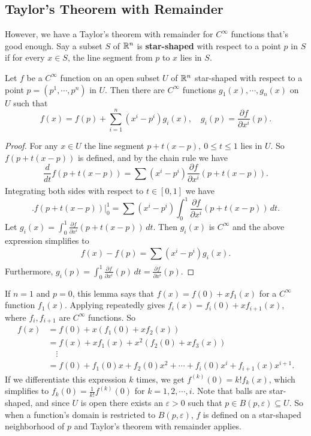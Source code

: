 \subsection{Taylor's Theorem with Remainder}
However, we have a Taylor's theorem with remainder for $C^{\infty}$ functions that's good enough. Say a subset $S$ of $\mathbb{R}^n $ is \textbf{star-shaped} with respect to a point $p$ in $S$ if for every $x\in S$, the line segment from $p$ to $x$ lies in $S$.
\begin{lemma}
    Let $f$ be a $C^{\infty}$ function on an open subset $U$ of $\mathbb{R}^n $ star-shaped with respect to a point $p=(p^1,\cdots ,p^n )$ in $U$. Then there are $C^{\infty}$ functions $g_1(x),\cdots ,g_n (x)$ on $U$ such that \[
        f(x)=f(p)+\sum_{i=1}^{n} (x^i -p^i )g_i (x), \quad g_i (p)=\frac{\partial f}{\partial x^i }(p).
    \]  
\end{lemma}
\begin{proof}
    For any $x\in U$ the line segment $p+t(x-p), \ 0\leq t \leq 1$ lies in $U$. So $f(p+t(x-p))$ is defined, and by the chain rule we have \[
        \frac{d}{dt}f(p+t(x-p))=\sum_{}^{} (x^i -p^i ) \frac{\partial f}{\partial x^i }(p+t(x-p)).
    \] Integrating both sides with respect to $t\in [0,1]$ we have \[
    \Big. f(p+t(x-p)) \Big| _0^1 = \sum_{}^{} (x^i -p^i )\int_{0}^{1} \frac{\partial f}{\partial x^i }(p+t(x-p)) \, dt.
\] Let $g_i (x)=\int_{0}^{1} \frac{\partial f}{\partial x^i }(p+t(x-p)) \, dt$. Then $g_i (x)$ is $C^{\infty}$ and the above expression simplifies to \[
f(x)-f(p)=\sum_{}^{} (x^i -p^i )g_i (x).
\] Furthermore, $g_i (p)=\int_{0}^{1} \frac{\partial f}{\partial x^i }(p) \, dt=\frac{\partial f}{\partial x^i }(p)$. 
\end{proof}
If $n=1$ and $p=0$, this lemma says that $f(x)=f(0)+xf_1(x)$ for a $C^{\infty}$ function $f_1(x)$. Applying repeatedly gives $f_i (x)=f_i (0)+xf_{i+1}(x)$, where $f_i ,f_{i+1}$ are $C^{\infty}$ functions. So 
\begin{align*}
    f(x)&=f(0)+x(f_1(0)+xf_2(x))\\
        &=f(x)+xf_1(x)+x^2(f_2(0)+xf_3(x))\\
        &\quad \vdots \\
        &=f(0)+f_1(0)x+f_2(0)x^2+\cdots +f_i (0)x^i +f_{i+1}(x)x^{i+1}.
\end{align*} If we differentiate this expression $k$ times, we get $f^{(k)}(0)=k!f_k(x)$, which simplifies to $f_k(0)=\frac{1}{k!}f^{(k)}(0)$ for $k=1,2,\cdots ,i$. Note that balls are star-shaped, and since $U$ is open there exists an $\varepsilon >0$ such that $p\in B(p,\varepsilon )\subseteq U$. So when a function's domain is restricted to $B(p,\varepsilon )$, $f$ is defined on a star-shaped neighborhood of $p$ and Taylor's theorem with remainder applies.

